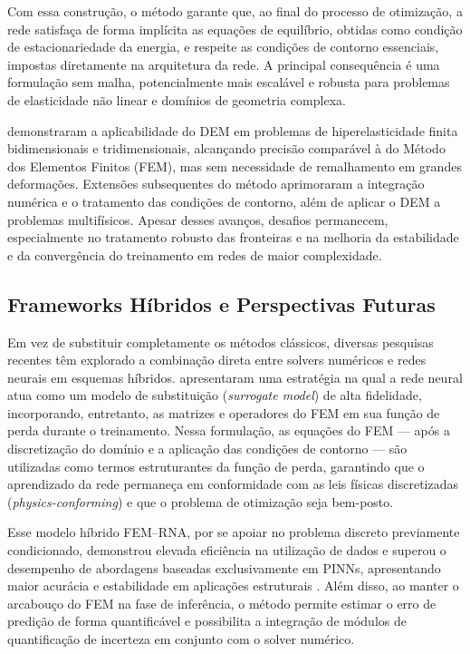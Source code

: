 \documentclass[12pt,openright,oneside,a4paper,english,brazil]{abntex2}
\begin{document}
Com essa construção, o método garante que, ao final do processo de otimização, a rede satisfaça de forma implícita as equações de equilíbrio, obtidas como condição de estacionariedade da energia, e respeite as condições de contorno essenciais, impostas diretamente na arquitetura da rede. A principal consequência é uma formulação sem malha, potencialmente mais escalável e robusta para problemas 
de elasticidade não linear e domínios de geometria complexa.

\textcite{samaniego2020} demonstraram a aplicabilidade do DEM em problemas de hiperelasticidade finita bidimensionais e tridimensionais, alcançando precisão comparável à do Método dos Elementos Finitos (FEM), mas sem necessidade de remalhamento em grandes deformações. Extensões subsequentes do método \cite{nguyen2021} aprimoraram a integração numérica e o tratamento das condições de contorno, 
além de aplicar o DEM a problemas multifísicos. Apesar desses avanços, desafios permanecem, especialmente no tratamento robusto das fronteiras e na melhoria da estabilidade e da convergência do treinamento em redes de maior complexidade.

\subsection{Frameworks Híbridos e Perspectivas Futuras}

Em vez de substituir completamente os métodos clássicos, diversas pesquisas recentes têm explorado a combinação direta entre solvers numéricos e redes neurais em esquemas híbridos. \textcite{meethal2023} apresentaram uma estratégia na qual a rede neural atua como um modelo de substituição (\textit{surrogate model}) de alta fidelidade, incorporando, entretanto, as matrizes e operadores do 
FEM em sua função de perda durante o treinamento. Nessa formulação, as equações do FEM — após a discretização do domínio e a aplicação das condições de contorno — são utilizadas como termos estruturantes da função de perda, garantindo que o aprendizado da rede permaneça em conformidade com as leis físicas discretizadas (\textit{physics-conforming}) e que o 
problema de otimização seja bem-posto.

Esse modelo híbrido FEM–RNA, por se apoiar no problema discreto previamente condicionado, demonstrou elevada eficiência na utilização de dados e superou o desempenho de abordagens baseadas exclusivamente em PINNs, apresentando maior acurácia e estabilidade em aplicações estruturais \cite{meethal2023}. Além disso, ao manter o arcabouço do FEM na fase de inferência, o método permite estimar o 
erro de predição de forma quantificável e possibilita a integração de módulos de quantificação de incerteza em conjunto com o solver numérico.
\end{document}
